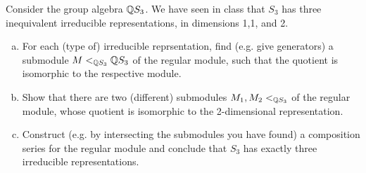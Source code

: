 \documentclass[leqno]{article}
\begin{document}
\newpage
\begin{problem}
Consider the group algebra $\mathbb{Q} S_3$. We have seen in class that $S_3$ has three inequivalent irreducible representations, in dimensions 1,1, and 2.
\begin{enumerate}[(a)]
    \item For each (type of) irreducible reprsentation, find (e.g. give generators) a submodule $M <_{\mathbb{Q} S_3} \mathbb{Q} S_3$ of the regular module, such that the quotient is isomorphic to the respective module.
    \item Show that there are two (different) submodules $M_1,M_2 <_{\mathbb{Q} S_3}$ of the regular module, whose quotient is isomorphic to the 2-dimensional representation.
    \item Construct (e.g. by intersecting the submodules you have found) a composition series for the regular module and conclude that $S_3$ has exactly three irreducible representations.
\end{enumerate}
\end{problem}
\end{document}
